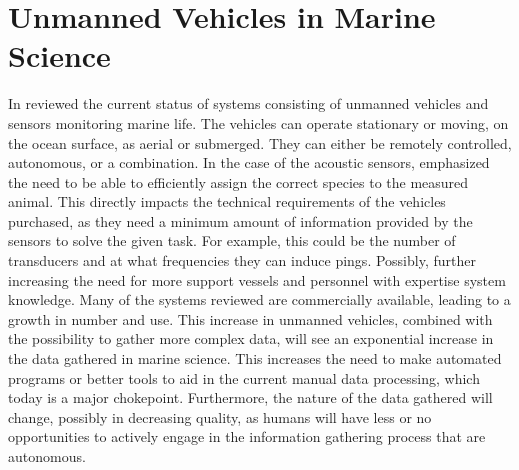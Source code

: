 


\section{Unmanned Vehicles in Marine Science}
        In \citeyear{VERFUSS201917} \citeauthor{VERFUSS201917}\cite{VERFUSS201917} reviewed the current status of systems consisting of unmanned vehicles and  sensors monitoring marine life. The vehicles can operate stationary or moving, on the ocean surface, as aerial or submerged.  They can either be remotely controlled, autonomous, or a combination. In the case of the acoustic sensors, \citeauthor{VERFUSS201917} emphasized the need to be able to efficiently assign the correct species to the measured animal. This directly impacts the technical requirements of the vehicles purchased, as they need a minimum amount of information provided by the sensors to solve the given task. For example, this could be the number of transducers and at what frequencies they can induce pings. Possibly, further increasing the need for more support vessels and personnel with expertise system knowledge. Many of the systems reviewed are commercially available, leading to a growth in number and use.  This increase in unmanned vehicles, combined with the possibility to gather more complex data, will see an exponential increase in the data gathered in marine science\cite{malde2020machine}. This increases the need to make automated programs or better tools to aid in the current manual data processing, which today is a major chokepoint. Furthermore,  the nature of the data gathered will change, possibly in decreasing quality, as humans will have less or no opportunities to actively engage in the information gathering process that are autonomous.
        
